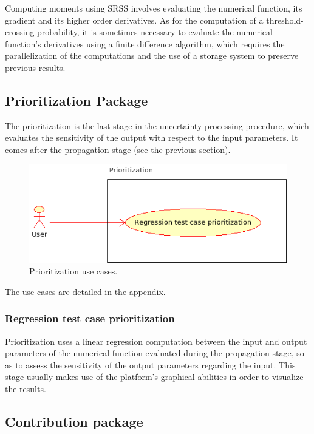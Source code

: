 Computing moments using SRSS involves evaluating the numerical function, its gradient and its higher order derivatives. As for the computation of a threshold-crossing probability, it is sometimes necessary to evaluate the numerical function's derivatives using a finite difference algorithm, which requires the parallelization of the computations and the use of a storage system to preserve previous results.

\subsection{Prioritization Package}

The prioritization is the last stage in the uncertainty processing procedure, which evaluates the sensitivity of the output with respect to the input parameters. It comes after the propagation stage (see the previous section).

\begin{figure}[htb]
  \begin{center}
    \includegraphics[scale=0.8]{Figures/analysis/prioritization.png}
    \caption{Prioritization use cases.}\label{fig:prioritization}
  \end{center}
\end{figure}

The use cases are detailed in the appendix.

\subsubsection{Regression test case prioritization}

Prioritization uses a linear regression computation between the input and output parameters of the numerical function evaluated during the propagation stage, so as to assess the sensitivity of the output parameters regarding the input. This stage usually makes use of the platform's graphical abilities in order to visualize the results.

\subsection{Contribution package}

